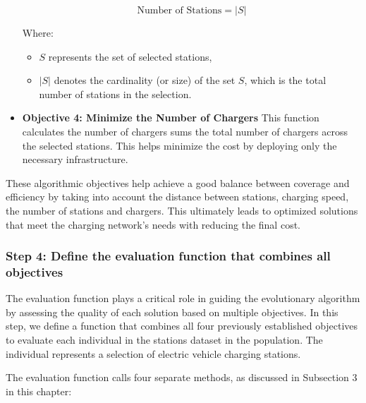 \begin{itemize}
   \begin{equation}
    \text{Number of Stations} = \left| S \right|
    \end{equation}
    
    Where:
    \begin{itemize}
        \item $S$ represents the set of selected stations,
        \item $\left| S \right|$ denotes the cardinality (or size) of the set $S$, which is the total number of stations in the selection.
    \end{itemize}
    \noindent

    
    \item \textbf{Objective 4: Minimize the Number of Chargers}
    This function calculates the number of chargers sums the total number of chargers across the selected stations. This helps minimize the cost by deploying only the necessary infrastructure.

    \end{itemize}

These algorithmic objectives help achieve a good balance between coverage and efficiency by taking into account the distance between stations, charging speed, the number of stations and chargers. This ultimately leads to optimized solutions that meet the charging network's needs with reducing the final cost.
\newline



\subsubsection*{Step 4: Define the evaluation function that combines all objectives}
The evaluation function plays a critical role in guiding the evolutionary algorithm by assessing the quality of each solution based on multiple objectives\cite{Multi-Objective Optimization using Evolutionary Algorithms}. In this step, we define a function that combines all four previously established objectives to evaluate each individual in the stations dataset in the population. The individual represents a selection of electric vehicle charging stations.

The evaluation function calls four separate methods, as discussed in Subsection 3 in this chapter:

